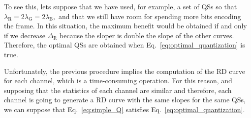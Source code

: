 To see this, lets suppose that we have used, for example, a set of QSs
so that
$\lambda_{\text{R}} = 2\lambda_{\text{G}} = 2\lambda_{\text{B}},$ and
that we still have room for spending more bits encoding the frame. In
this situation, the maximum benefit would be obtained if and only if
we decrease $\Delta_{\text{R}}$ because the sloper is double the slope
of the other curves. Therefore, the optimal QSs are obtained when
Eq.~\ref{eq:optimal_quantization} is true.

\begin{comment}
Thus, the optimal QSs should
operate in the curves with the same RD slope,
\begin{equation}
  \lambda_{\text{R}} = \lambda_{\text{G}} = \lambda_{\text{B}},
  \label{eq:optimal_quantization}
\end{equation}
for a given total bit-rate $R$, which implies that the contribution of each channel (the ratio between
quality and bit-rate) to the quality of $\tilde{x}$ has been highest
possible~\cite{vetterli1995wavelets,sayood2017introduction}.
\end{comment}

Unfortunately, the previous procedure implies the computation of the
RD curve for each channel, which is a time-consuming operation. For
this reason, and supposing that the statistics of each channel are
similar and therefore, each channel is going to generate a RD curve
with the same slopes for the same QSs, we can suppose that
Eq.~\ref{eq:simple_Q} satisfies Eq.~\ref{eq:optimal_quantization}.

